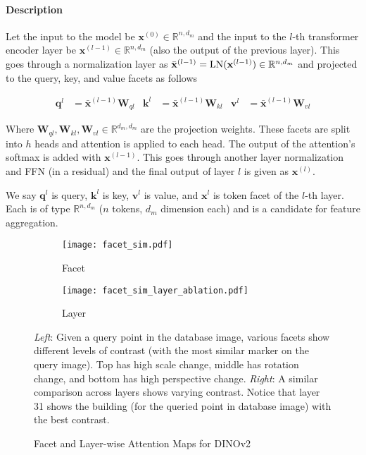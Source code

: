 \paragraph{Description}

Let the input to the model be $\mathbf{x}^{(0)} \in \mathbb{R}^{n,
d_m}$ and the input to the $l$-th transformer encoder layer be
$\mathbf{x}^{(l-1)} \in \mathbb{R}^{n, d_m}$ (also the output of the
previous layer). This goes through a normalization layer as
\begin{math}
    \bar{\mathbf{x}}^{(l-1)} = \textup{LN}(\mathbf{x}^{(l-1)}) \in
        \mathbb{R}^{n, d_m}
\end{math}
and projected to the query, key, and value facets as follows

\begin{align}
    \mathbf{q}^l &= \bar{\mathbf{x}}^{(l-1)} \mathbf{W}_{ql} &
    \mathbf{k}^l &= \bar{\mathbf{x}}^{(l-1)} \mathbf{W}_{kl} &
    \mathbf{v}^l &= \bar{\mathbf{x}}^{(l-1)} \mathbf{W}_{vl}
\end{align}

Where $\mathbf{W}_{ql}, \mathbf{W}_{kl}, \mathbf{W}_{vl} \in
\mathbb{R}^{d_m, d_m}$ are the projection weights. These facets are
split into $h$ heads and attention is applied to each head. The output
of the attention's softmax is added with $\mathbf{x}^{(l-1)}$. This
goes through another layer normalization and FFN (in a residual) and
the final output of layer $l$ is given as $\mathbf{x}^{(l)}$.

We say $\mathbf{q}^l$ is query, $\mathbf{k}^l$ is key, $\mathbf{v}^l$
is value, and $\mathbf{x}^l$ is token facet of the $l$-th layer. Each
is of type $\mathbb{R}^{n, d_m}$ ($n$ tokens, $d_m$ dimension each)
and is a candidate for feature aggregation.

\begin{figure}
    \centering
    \begin{subfigure}[b]{0.49\textwidth}
        \centering
        \texttt{[image: facet\_sim.pdf]}
        \caption{Facet}
    \end{subfigure}
    \hfill
    \begin{subfigure}[b]{0.49\textwidth}
        \centering
        \texttt{[image: facet\_sim\_layer\_ablation.pdf]}
        \caption{Layer}
    \end{subfigure}
    \caption{Facet and Layer-wise Attention Maps for DINOv2}
    \small
        \emph{Left}: Given a query point in the database image,
        various facets show different levels of contrast (with the
        most similar marker on the query image). Top has high scale
        change, middle has rotation change, and bottom has high
        perspective change. 
        \emph{Right}: A similar comparison across layers shows varying
        contrast. Notice that layer 31 shows the building (for the
        queried point in database image) with the best contrast.
    \label{fig:anyloc_facet_layer}
\end{figure}

